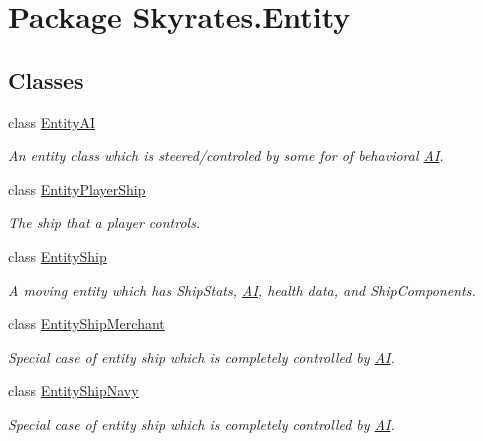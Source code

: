 \hypertarget{namespace_skyrates_1_1_entity}{\section{Package Skyrates.\-Entity}
\label{namespace_skyrates_1_1_entity}
}
\subsection*{Classes}
\begin{DoxyCompactItemize}
\item 
class \hyperlink{class_skyrates_1_1_entity_1_1_entity_a_i}{Entity\-A\-I}
\begin{DoxyCompactList}\small\item\em An entity class which is steered/controled by some for of behavioral \hyperlink{namespace_skyrates_1_1_a_i}{A\-I}. \end{DoxyCompactList}\item 
class \hyperlink{class_skyrates_1_1_entity_1_1_entity_player_ship}{Entity\-Player\-Ship}
\begin{DoxyCompactList}\small\item\em The ship that a player controls. \end{DoxyCompactList}\item 
class \hyperlink{class_skyrates_1_1_entity_1_1_entity_ship}{Entity\-Ship}
\begin{DoxyCompactList}\small\item\em A moving entity which has Ship\-Stats, \hyperlink{namespace_skyrates_1_1_a_i}{A\-I}, health data, and Ship\-Components. \end{DoxyCompactList}\item 
class \hyperlink{class_skyrates_1_1_entity_1_1_entity_ship_merchant}{Entity\-Ship\-Merchant}
\begin{DoxyCompactList}\small\item\em Special case of entity ship which is completely controlled by \hyperlink{namespace_skyrates_1_1_a_i}{A\-I}. \end{DoxyCompactList}\item 
class \hyperlink{class_skyrates_1_1_entity_1_1_entity_ship_navy}{Entity\-Ship\-Navy}
\begin{DoxyCompactList}\small\item\em Special case of entity ship which is completely controlled by \hyperlink{namespace_skyrates_1_1_a_i}{A\-I}. \end{DoxyCompactList}\item 

\end{DoxyCompactItemize}
